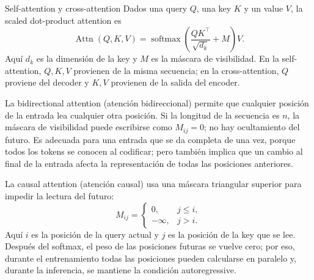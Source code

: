 
\begin{importantbox}{Self-attention y cross-attention}
Dados una query $Q$, una key $K$ y un value $V$, la scaled dot-product attention es
\[
\operatorname{Attn}(Q,K,V)=\operatorname{softmax}\!\left(\frac{QK^{\top}}{\sqrt{d_k}}+M\right)V.
\]
Aquí $d_k$ es la dimensión de la key y $M$ es la máscara de visibilidad. En la self-attention, $Q,K,V$ provienen de la misma secuencia; en la cross-attention, $Q$ proviene del decoder y $K,V$ provienen de la salida del encoder.
\end{importantbox}


La bidirectional attention (atención bidireccional) permite que cualquier posición de la entrada lea cualquier otra posición. Si la longitud de la secuencia es $n$, la máscara de visibilidad puede escribirse como $M_{ij}=0$; no hay ocultamiento del futuro. Es adecuada para una entrada que se da completa de una vez, porque todos los tokens se conocen al codificar; pero también implica que un cambio al final de la entrada afecta la representación de todas las posiciones anteriores.


La causal attention (atención causal) usa una máscara triangular superior para impedir la lectura del futuro:
\[
M_{ij}=\begin{cases}
0,&j\le i,\\
-\infty,&j>i.
\end{cases}
\]
Aquí $i$ es la posición de la query actual y $j$ es la posición de la key que se lee. Después del softmax, el peso de las posiciones futuras se vuelve cero; por eso, durante el entrenamiento todas las posiciones pueden calcularse en paralelo y, durante la inferencia, se mantiene la condición autoregressive.


